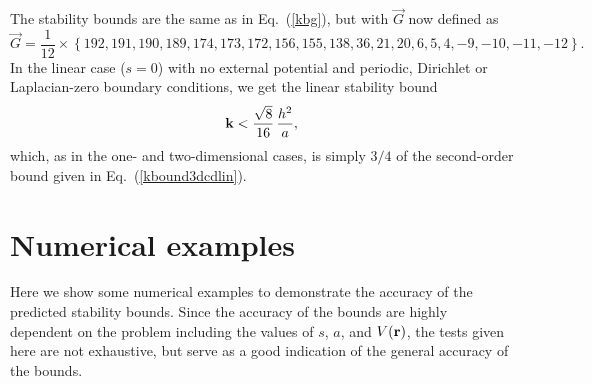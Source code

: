 \documentclass{article}
\begin{document}
The stability bounds are the same as in Eq.~(\ref{kbg}), but with $\vec G$ now defined as
\begin{equation}
\label{G3D2SHOC}
\vec G = \frac{1}{12} \times \left\{192,191,190,189,174,173,172,156,155,138,36,21,20,6,5,4,-9,-10,-11,-12 \right\}.
\end{equation}
In the linear case ($s=0$) with no external potential and periodic, Dirichlet or Laplacian-zero boundary conditions, we get the linear stability bound
\begin{equation}
\label{kbound3d2shoclin}
{\bf k} < \frac{\sqrt{8}}{16}\,\frac{h^2}{a},
\end{equation}
which, as in the one- and two-dimensional cases, is simply $3/4$ of the second-order bound given in Eq.~(\ref{kbound3dcdlin}).

\section{Numerical examples}
\label{s:num}
Here we show some numerical examples to demonstrate the accuracy of the predicted stability bounds.  Since the accuracy of the bounds are highly dependent on the problem including the values of $s$, $a$, and $V({\bf r})$, the tests given here are not exhaustive, but serve as a good indication of the general accuracy of the bounds.  
\end{document}
